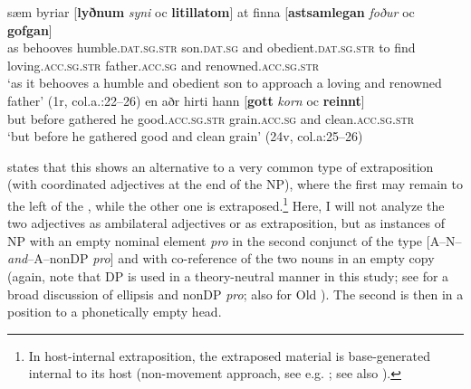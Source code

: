 \documentclass[output=paper,colorlinks,citecolor=brown]{langscibook}
\begin{document}
\begin{exe}
\ex\label{ch8ex35}
\begin{xlist}
\ex\label{ch8ex35a}
\gll sæm byriar {[}\textbf{lyðnum} \textit{syni} oc \textbf{litillatom}{]} at finna {[}\textbf{astsamlegan} \textit{foður} oc \textbf{gofgan}{]} \\
as behooves humble.\textsc{dat.sg.str} son.\textsc{dat.sg} and obedient.\textsc{dat.sg.str} to find {loving.\textsc{acc.sg.str}} father.\textsc{acc.sg} and renowned.\textsc{acc.sg.str}\\
\glt `as it behooves a humble and obedient son to approach a loving and renowned father' (1r, col.a.:22--26)
\ex\label{ch8ex35b}
\gll en aðr hirti hann {[}\textbf{gott} \textit{korn} oc \textbf{reinnt}{]} \\
but before gathered he good.\textsc{acc.sg.str} grain.\textsc{acc.sg} and clean.\textsc{acc.sg.str}\\
\glt `but before he gathered good and clean grain' (24v, col.a:25--26)
\end{xlist}
\end{exe}

\citet[72]{Faarlund04} states that this  shows an alternative to a
very common type of extraposition (with coordinated adjectives at the
end of the NP), where the first  may remain to the left of the
, while the other one is extraposed.\footnote{In host-internal
  extraposition, the extraposed material is base-generated internal to
  its host (non-movement approach, see e.g. \citealp[ch.7]{deVries2002}; see
  also \citealp{Overfelt2015}).} Here, I will not analyze the two adjectives as
ambilateral adjectives or as extraposition, but as instances of NP
 with an empty nominal element \emph{pro} in the second
conjunct of the type {[}A--N--\emph{and}--A--nonDP \emph{pro}{]} and
with co-reference of the two nouns in an empty copy (again, note that
DP is used in a theory-neutral manner in this study; see \citealp{Lobeck1995} for a broad
discussion of ellipsis and nonDP \emph{pro}; also \citealp{Haumann03} for Old
). The second  is then in a  position to a
phonetically empty head.
\end{document}

